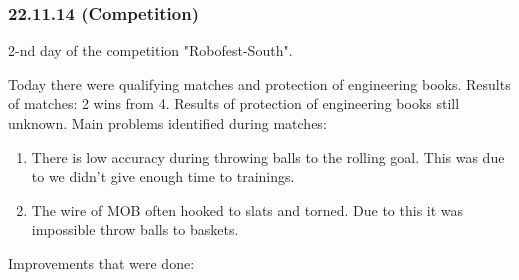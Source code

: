 \subsubsection{22.11.14 (Competition)}
\begin{center}
	2-nd day of the competition "Robofest-South".
\end{center}
Today there were qualifying matches and protection of engineering books.
\newline 
Results of matches: 2 wins from 4. 
\newline
Results of protection of engineering books still unknown.
\newline
Main problems identified during matches:
\begin{enumerate}
	\item There is low accuracy during throwing balls to the rolling goal. This was due to we didn't give enough time to trainings.
	
	\item The wire of MOB often hooked to slats and torned. Due to this it was impossible throw balls to baskets.
	
\end{enumerate} 
Improvements that were done:
